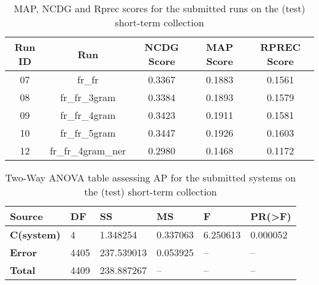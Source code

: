 \begin{table}[h!]
    \begin{center}
        \caption{MAP, NCDG and Rprec scores for the submitted runs on the (test) short-term collection}
        \label{tab:st_scores}
        \begin{tabular}{|c|c||c|c|c|}
            \hline
            \textbf{Run ID} & \textbf{Run} & \textbf{NCDG Score} & \textbf{MAP Score} & \textbf{RPREC Score}\\
            \hline\hline
            07 & fr\_fr & 0.3367 & 0.1883 & 0.1561 \\
            \hline
            08 & fr\_fr\_3gram & 0.3384 & 0.1893 & 0.1579 \\
            \hline
            09 & fr\_fr\_4gram & 0.3423 & 0.1911 & 0.1581 \\
            \hline
            10 & fr\_fr\_5gram & 0.3447 & 0.1926 & 0.1603 \\
            \hline
            12 & fr\_fr\_4gram\_ner & 0.2980 & 0.1468 & 0.1172 \\
            \hline
        \end{tabular}
    \end{center}
\end{table}

\begin{table}[h!]
    \centering
    \caption{Two-Way ANOVA table assessing AP for the submitted systems on the (test) short-term collection}
    \label{tab:st_anova}
    \begin{tabular}{|l|l|l|l|l|l|}
    \hline
        \textbf{Source} & \textbf{DF} & \textbf{SS} & \textbf{MS} & \textbf{F} & \textbf{PR(>F)} \\ \hline\hline
        \textbf{C(system)} & 4 & 1.348254 & 0.337063 & 6.250613 & 0.000052 \\ \hline
        \textbf{Error} & 4405 & 237.539013 & 0.053925 & -- & -- \\ \hline
        \textbf{Total} & 4409 & 238.887267 & -- & -- & -- \\ \hline
    \end{tabular}
\end{table}

